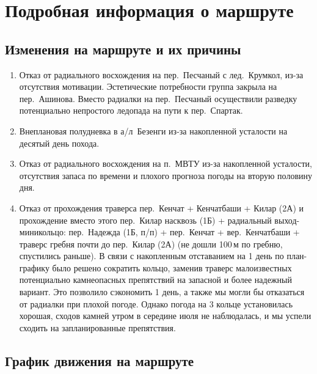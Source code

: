 \section{Подробная информация о маршруте}\label{sec:route}
	\subsection{Изменения на маршруте и их причины}\label{subsec:changes_of_way}
		\begin{enumerate}
			\item Отказ от радиального восхождения на пер.~Песчаный с лед.~Крумкол, из-за отсутствия мотивации.
			Эстетические потребности группа закрыла на пер.~Ашинова. Вместо радиалки на пер.~Песчаный осуществили
			разведку потенциально непростого ледопада на пути к пер.~Спартак.
			\item Внеплановая полудневка в а/л~Безенги из-за накопленной усталости на десятый день похода.
			\item Отказ от радиального восхождения на п.~МВТУ из-за накопленной усталости, отсутствия запаса по
			времени и плохого прогноза погоды на вторую половину дня.
			\item Отказ от прохождения траверса пер.~Кенчат + Кенчатбаши + Килар (2А) и прохождение вместо этого
			пер.~Килар насквозь (1Б) + радиальный выход-миникольцо: пер.~Надежда (1Б, п/п) + пер.~Кенчат +
			вер.~Кенчатбаши + траверс гребня почти до пер.~Килар (2А) (не дошли 100\,м по гребню, спустились раньше).
			В связи с накопленным отставанием на 1 день по план-графику было решено сократить кольцо, заменив траверс
			малоизвестных потенциально камнеопасных препятствий на запасной и более надежный вариант. Это позволило
			сэкономить 1 день, а также мы могли бы отказаться от радиалки при плохой погоде. Однако погода на 3
			кольце установилась хорошая, сходов камней утром в середине июля не наблюдалась, и мы успели сходить на
			запланированные препятствия.
		\end{enumerate}
	
	
	\subsection{График движения на маршруте}
		\setlength{\tabcolsep}{2pt}
		
